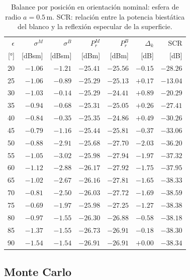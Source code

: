 \documentclass[11pt,a4paper]{report}
\begin{document}
\begin{table}[H]
\centering
\caption{Balance por posición en orientación nominal: esfera de radio $a=0.5$\,m. SCR: relación entre la potencia biestática del blanco y la reflexión especular de la superficie.}
\label{tab:esfera_nominal}
\small
\begin{tabular}{@{}rrrrrrr@{}}
\toprule
$\epsilon$ & $\sigma^M$ & $\sigma^B$ & $P_r^M$ & $P_r^B$ & $\Delta_k$ & SCR \\
{[°]} & [dBsm] & [dBsm] & [dBm] & [dBm] & [dB] & [dB] \\
\midrule
20 & $-1.06$ & $-1.21$ & $-25.41$ & $-25.56$ & $-0.15$ & $-28.26$ \\
25 & $-1.06$ & $-0.89$ & $-25.29$ & $-25.13$ & $+0.17$ & $-13.04$ \\
30 & $-1.03$ & $-0.14$ & $-25.29$ & $-24.41$ & $+0.89$ & $-20.29$ \\
35 & $-0.94$ & $-0.68$ & $-25.31$ & $-25.05$ & $+0.26$ & $-27.41$ \\
40 & $-0.84$ & $-0.35$ & $-25.35$ & $-24.86$ & $+0.49$ & $-30.26$ \\
45 & $-0.79$ & $-1.16$ & $-25.44$ & $-25.81$ & $-0.37$ & $-33.06$ \\
50 & $-0.88$ & $-2.91$ & $-25.68$ & $-27.70$ & $-2.03$ & $-36.20$ \\
55 & $-1.05$ & $-3.02$ & $-25.98$ & $-27.94$ & $-1.97$ & $-37.32$ \\
60 & $-1.12$ & $-2.88$ & $-26.17$ & $-27.92$ & $-1.75$ & $-37.95$ \\
65 & $-1.02$ & $-2.67$ & $-26.16$ & $-27.81$ & $-1.65$ & $-38.33$ \\
70 & $-0.81$ & $-2.50$ & $-26.03$ & $-27.72$ & $-1.69$ & $-38.59$ \\
75 & $-0.69$ & $-1.97$ & $-25.98$ & $-27.25$ & $-1.27$ & $-38.38$ \\
80 & $-0.97$ & $-1.55$ & $-26.30$ & $-26.88$ & $-0.58$ & $-38.18$ \\
85 & $-1.37$ & $-1.55$ & $-26.73$ & $-26.91$ & $-0.18$ & $-38.30$ \\
90 & $-1.54$ & $-1.54$ & $-26.91$ & $-26.91$ & $+0.00$ & $-38.34$ \\
\bottomrule
\end{tabular}
\end{table}

\subsection{Monte Carlo}
\end{document}
